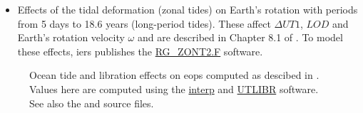 \begin{itemize}
\begin{itemize}
    \end{itemize}

    \item Effects of the tidal deformation (zonal tides) on Earth’s rotation with 
      periods from 5 days to 18.6 years (long-period tides). These affect 
      $\Delta UT1$, $LOD$ and Earth's rotation velocity $\omega$ and are 
      described in Chapter 8.1 of \cite{iers2010}. To model these effects, \gls{iers} 
      publishes the \href{https://iers-conventions.obspm.fr/content/chapter8/software/RG_ZONT2.F}{RG\_ZONT2.F} 
      software.

\end{itemize}

\begin{figure}
  \centering
  
  \caption{Ocean tide and libration effects on \glspl{eop} computed as descibed in \cite{iers2010}. 
    Values here are computed using the \protect\href{https://hpiers.obspm.fr/iers/models/interp.f}{interp} and 
    \protect\href{https://iers-conventions.obspm.fr/content/chapter5/software/UTLIBR.F}{UTLIBR} software. 
    See also the  and  
    source files.}
  \label{fig:eop-variations}
\end{figure}
